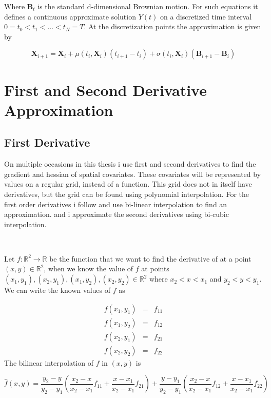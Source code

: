 Where  $\textbf{B}_t$ is the standard d-dimensional Brownian motion. For such equations it defines a continuous approximate solution $Y(t)$ on a discretized time interval $0=t_0 < t_1 < \dots < t_N = T$. At the discretization points the approximation is given by

\begin{equation}
    \textbf{X}_{i+1} = \textbf{X}_i + \mu(t_i, \textbf{X}_i)(t_{i+1} - t_i) + \sigma(t_i, \textbf{X}_i)(\textbf{B}_{i+1} - \textbf{B}_i)
    \label{eq: euler approximation}
\end{equation}




\section{First and Second Derivative Approximation}
\subsection{First Derivative}
\label{subsec: gradient estimation}
On multiple occasions in this thesis i use first and second derivatives to find the gradient and hessian of spatial covariates. These covariates will be represented by values on a regular grid, instead of a function. This grid does not in itself have derivatives, but the grid can be found using polynomial interpolation. For the first order derivatives i follow \parencite{michelot_langevin_2019} and use bi-linear interpolation to find an approximation. and i approximate the second derivatives using bi-cubic interpolation. 

\

Let $f:\mathbb{R}^2\rightarrow \mathbb{R}$ be the function that we want to find the derivative of at a point $(x,y) \in \mathbb{R}^2$, when we know the value of $f$ at points $(x_1, y_1), (x_2, y_1), (x_1, y_2), (x_2, y_2) \in \mathbb{R}^2$ where $x_2 < x < x_1$ and $y_2 < y < y_1$. We can write the known values of $f$ as 


$$
\begin{array}{lcl}
     f(x_1, y_1)& = & f_{11}  \\
     f(x_1, y_2)& = & f_{12}  \\
     f(x_2, y_1)& = & f_{21}  \\
     f(x_2, y_2)& = & f_{22}  
\end{array}
$$
The bilinear interpolation of $f$ in $(x,y)$ is  

$$
\hat{f}(x,y) = \frac{y_2-y}{y_2-y_1}(\frac{x_2-x}{x_2-x_1}f_{11} + \frac{x-x_1}{x_2-x_1}f_{21}) + \frac{y-y_1}{y_2-y_1}(\frac{x_2-x}{x_2-x_1}f_{12} + \frac{x-x_1}{x_2-x_1}f_{22})
$$

